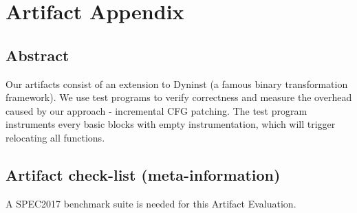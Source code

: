 \documentclass{sigplanconf}
\begin{document}




\appendix
\section{Artifact Appendix}

\subsection{Abstract}


Our artifacts consist of an extension to Dyninst (a famous binary transformation framework). 
We use test programs to verify correctness and measure the overhead caused by our approach - incremental CFG patching. The test
program instruments every basic blocks with empty instrumentation, which will trigger relocating all functions.


\subsection{Artifact check-list (meta-information)}


A SPEC2017 benchmark suite is needed for this Artifact Evaluation.
\end{document}
